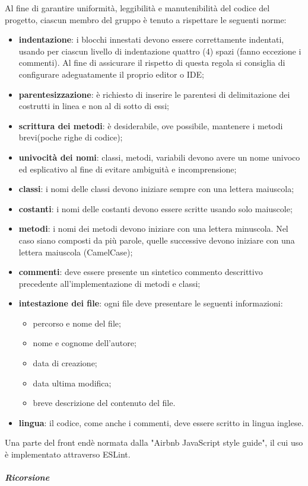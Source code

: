 Al fine di garantire uniformità, leggibilità e manutenibilità del codice del progetto,
ciascun membro del gruppo è tenuto a rispettare le seguenti norme:
	\begin{itemize}
		\item \textbf{indentazione}: i blocchi innestati devono essere correttamente 
			indentati, usando per ciascun livello di indentazione quattro (4) spazi (fanno 
			eccezione i commenti). Al fine di assicurare il rispetto di questa regola si 
			consiglia di configurare adeguatamente il proprio editor o IDE;
		\item \textbf{parentesizzazione}: è richiesto di inserire le parentesi di 
			delimitazione dei costrutti in linea e non al di sotto di essi;
		\item \textbf{scrittura dei metodi}: è desiderabile, ove possibile, 
			mantenere i metodi brevi(poche righe di codice);
		\item \textbf{univocità dei nomi}: classi, metodi, variabili devono avere un 
			nome univoco	ed esplicativo al fine di evitare ambiguità e incomprensione;
		\item \textbf{classi}: i nomi delle classi devono iniziare sempre con una 
			lettera maiuscola;		
		\item \textbf{costanti}: i nomi delle costanti devono essere scritte usando 
			solo maiuscole;
		\item \textbf{metodi}: i nomi dei metodi devono iniziare con una lettera 
			minuscola. Nel caso siano composti da più parole, quelle successive devono iniziare con una 
			lettera maiuscola (CamelCase\glo{});
		\item \textbf{commenti}: deve essere presente un sintetico commento descrittivo 
			precedente all'implementazione di metodi e classi;
		\item \textbf{intestazione dei file}: ogni file deve presentare le seguenti informazioni:
			\begin{itemize}
				\item percorso e nome del file;
				\item nome e cognome dell'autore;
				\item data di creazione;
				\item data ultima modifica;
				\item breve descrizione del contenuto del file.
			\end{itemize}
		\item \textbf{lingua}: il codice, come anche i commenti, deve essere scritto 
			in lingua inglese.
	\end{itemize}
Una parte del front end\glosp è normata dalla "Airbnb JavaScript style 
guide", il cui uso è implementato attraverso ESLint\glo. \newline \newline
\subparagraph{Ricorsione}  \mbox{}\\

